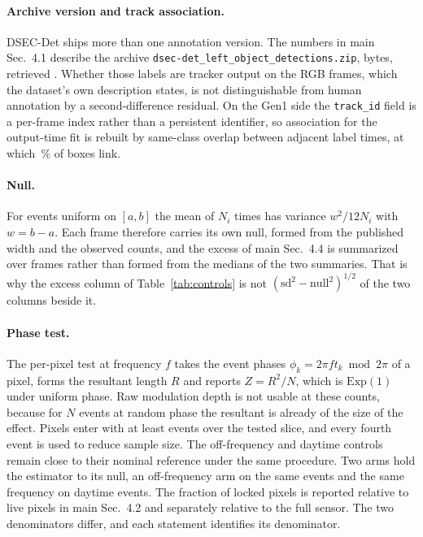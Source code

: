 \documentclass[10pt,twocolumn,letterpaper]{article}
\begin{document}
\paragraph{Archive version and track association.} DSEC-Det ships more than
one annotation version. The numbers in main Sec.~4.1 describe the archive
\texttt{dsec-det\_left\_object\_detections.zip}, \ddArchiveBytes{} bytes,
retrieved \ddArchiveDate{}. Whether those labels are tracker output on the RGB
frames, which the dataset's own description states, is not distinguishable from
human annotation by a second-difference residual. On the Gen1 side the
\texttt{track\_id} field is a per-frame index rather than a persistent identifier,
so association for the output-time fit is rebuilt by same-class overlap between
adjacent label times, at which \outLinkPct\,\% of boxes link.

\paragraph{Null.} For events uniform on $[a,b]$ the mean of $N_{i}$ times has
variance $w^{2}/12N_{i}$ with $w=b-a$. Each frame therefore carries its own null,
formed from the published width and the observed counts, and the excess of main
Sec.~4.4 is summarized over frames rather than formed from the medians of the two
summaries. That is why the excess column of Table~\ref{tab:controls} is not
$(\mathrm{sd}^{2}-\mathrm{null}^{2})^{1/2}$ of the two columns beside it.

\paragraph{Phase test.} The per-pixel test at frequency $f$ takes the event phases
$\phi_{k}=2\pi f t_{k} \bmod 2\pi$ of a pixel, forms the resultant length $R$ and
reports $Z=R^{2}/N$, which is $\mathrm{Exp}(1)$ under uniform phase. Raw
modulation depth is not usable at these counts, because for $N$ events at random
phase the resultant is already of the size of the effect. Pixels enter with at
least \flickerMinEvents{} events over the tested slice, and every fourth event is
used to reduce sample size. The off-frequency and daytime controls remain close
to their nominal reference under the same procedure. Two arms hold the estimator to its null, an
off-frequency arm on the same events and the same frequency on daytime events.
The fraction of locked pixels is reported relative to live pixels in main Sec.~4.2 and
separately relative to the full sensor. The two denominators differ, and each statement
identifies its denominator.
\end{document}
